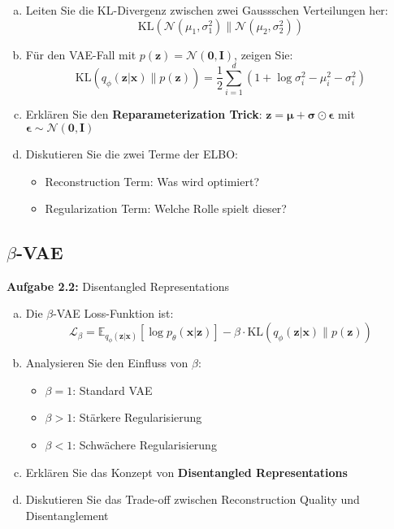 \documentclass[12pt,a4paper]{article}
\begin{document}
\begin{enumerate}[(a)]
    \item Leiten Sie die KL-Divergenz zwischen zwei Gaussschen Verteilungen her:
    $$\text{KL}(\mathcal{N}(\mu_1, \sigma_1^2) \| \mathcal{N}(\mu_2, \sigma_2^2))$$
    \item Für den VAE-Fall mit $p(\mathbf{z}) = \mathcal{N}(\mathbf{0}, \mathbf{I})$, zeigen Sie:
    $$\text{KL}(q_\phi(\mathbf{z}|\mathbf{x}) \| p(\mathbf{z})) = \frac{1}{2} \sum_{i=1}^{d} (1 + \log \sigma_i^2 - \mu_i^2 - \sigma_i^2)$$
    \item Erklären Sie den \textbf{Reparameterization Trick}: $\mathbf{z} = \boldsymbol{\mu} + \boldsymbol{\sigma} \odot \boldsymbol{\epsilon}$ mit $\boldsymbol{\epsilon} \sim \mathcal{N}(\mathbf{0}, \mathbf{I})$
    \item Diskutieren Sie die zwei Terme der ELBO:
    \begin{itemize}
        \item Reconstruction Term: Was wird optimiert?
        \item Regularization Term: Welche Rolle spielt dieser?
    \end{itemize}
\end{enumerate}

\subsection{$\beta$-VAE}

\textbf{Aufgabe 2.2:} Disentangled Representations

\begin{enumerate}[(a)]
    \item Die $\beta$-VAE Loss-Funktion ist:
    $$\mathcal{L}_{\beta} = \mathbb{E}_{q_\phi(\mathbf{z}|\mathbf{x})}[\log p_\theta(\mathbf{x}|\mathbf{z})] - \beta \cdot \text{KL}(q_\phi(\mathbf{z}|\mathbf{x}) \| p(\mathbf{z}))$$
    \item Analysieren Sie den Einfluss von $\beta$:
    \begin{itemize}
        \item $\beta = 1$: Standard VAE
        \item $\beta > 1$: Stärkere Regularisierung
        \item $\beta < 1$: Schwächere Regularisierung
    \end{itemize}
    \item Erklären Sie das Konzept von \textbf{Disentangled Representations}
    \item Diskutieren Sie das Trade-off zwischen Reconstruction Quality und Disentanglement
\end{enumerate}
\end{document}
